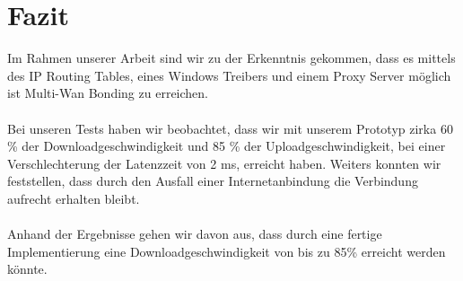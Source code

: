\chapter{Fazit}
\label{cha:Fazit}

Im Rahmen unserer Arbeit sind wir zu der Erkenntnis gekommen, dass es mittels des IP Routing Tables, eines Windows Treibers und einem Proxy Server möglich ist Multi-Wan Bonding zu erreichen.
\\ \ \\
Bei unseren Tests haben wir beobachtet, dass wir mit unserem Prototyp zirka 60 \% der Downloadgeschwindigkeit und 85 \% der Uploadgeschwindigkeit, bei einer Verschlechterung der Latenzzeit von 2 ms, erreicht haben. Weiters konnten wir feststellen, dass durch den Ausfall einer Internetanbindung die Verbindung aufrecht erhalten bleibt.
\\ \ \\
Anhand der Ergebnisse gehen wir davon aus, dass durch eine fertige Implementierung eine Downloadgeschwindigkeit von bis zu 85\% erreicht werden könnte.
